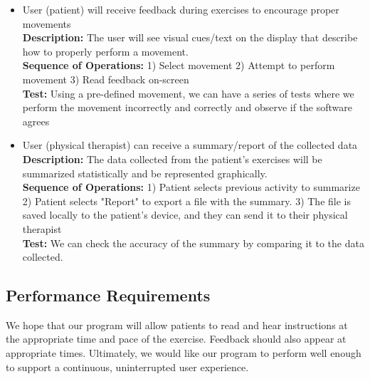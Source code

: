 \documentclass[onecolumn, draftclsnofoot,10pt, compsoc]{IEEEtran}
\begin{document}
\begin{itemize}
\item   User (patient) will receive feedback during exercises to encourage proper movements\\
\textbf{Description:} The user will see visual cues/text on the display that describe how to properly perform a movement. \\
\textbf{Sequence of Operations:} 1) Select movement 2) Attempt to perform movement 3) Read feedback on-screen\\
\textbf{Test:} Using a pre-defined movement, we can have a series of tests where we perform the movement incorrectly and correctly and observe if the software agrees

\item   User (physical therapist) can receive a summary/report of the collected data\\
\textbf{Description:} The data collected from the patient's exercises will be summarized statistically and be represented graphically.\\
\textbf{Sequence of Operations:} 1) Patient selects previous activity to summarize 2) Patient selects "Report" to export a file with the summary. 3) The file is saved locally to the patient's device, and they can send it to their physical therapist\\
\textbf{Test:} We can check the accuracy of the summary by comparing it to the data collected.\\

\end{itemize}
\subsection{Performance Requirements}
We hope that our program will allow patients to read and hear instructions at the appropriate time and pace of the exercise. Feedback should also appear at appropriate times. Ultimately, we would like our program to perform well enough to support a continuous, uninterrupted user experience.
\end{document}
